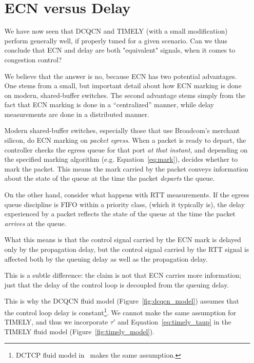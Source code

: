 \section {ECN versus Delay}
\label{sec:discuss}

We have now seen that DCQCN and TIMELY (with a small modification) perform
generally well, if properly tuned for a given scenario. Can we thus conclude
that ECN and delay are both "equivalent" signals, when it comes to congestion
control? 

We believe that the answer is no, because ECN has two potential advantages.  One
stems from a small, but important detail about how ECN marking is done on
modern, shared-buffer switches.  The second advantage stems simply from the fact
that ECN marking is done in a ``centralized'' manner, while delay measurements
are done in a distributed manner.

Modern shared-buffer switches, especially those that use Broadcom's merchant
silicon, do ECN marking on {\em packet egress}. When a packet is ready to
depart, the controller checks the egress queue for that port {\em at that
instant}, and depending on the specified marking algorithm (e.g.
Equation~\ref{eq:mark}), decides whether to mark the packet. This means the mark
carried by the packet conveys information about the state of the queue at the
time the packet {\em departs} the queue. 

On the other hand, consider what happens with RTT measurements. If the egress
queue discipline is FIFO within a priority class, (which it typically is), the
delay experienced by a packet reflects the state of the queue at the time the
packet {\em arrives} at the queue. 

What this means is that the control signal carried by the ECN mark is delayed
only by the propagation delay, but the control signal carried by the RTT signal
is affected both by the queuing delay as well as the propagation delay. 

This is a subtle difference: the claim is not that ECN carries more information;
just that the delay of the control loop is decoupled from the queuing delay.

This is why the DCQCN fluid model (Figure~\ref{fig:dcqcn_model}) assumes that
the control loop delay is constant\footnote{DCTCP fluid model
in~\cite{dctcp-analysis} makes the same assumption.}. We cannot make the same
assumption for TIMELY, and  thus we incorporate $\tau'$ and
Equation~\ref{eq:timely_taup} in the TIMELY fluid model
(Figure~\ref{fig:timely_model}).

